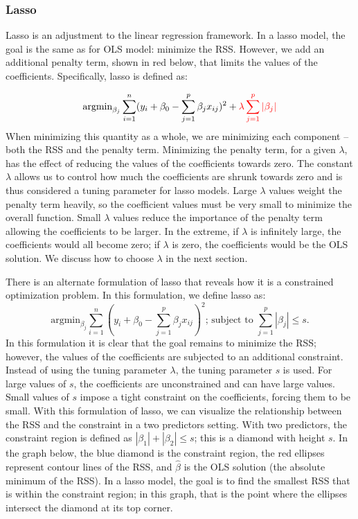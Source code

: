 \documentclass[
]{article}
\begin{document}
\hypertarget{lasso}{%
\subsubsection{Lasso}\label{lasso}}

Lasso is an adjustment to the linear regression framework. In a lasso
model, the goal is the same as for OLS model: minimize the RSS. However,
we add an additional penalty term, shown in red below, that limits the
values of the coefficients. Specifically, lasso is defined as:

\[\text{argmin}_{\beta_j}\sum_{i=1}^n ( y_i +\beta_0 - \sum_{j=1}^p \beta_jx_{ij} )^2 + \color{red}{\lambda \sum_{j=1}^p |\beta_j|}\]
When minimizing this quantity as a whole, we are minimizing each
component -- both the RSS and the penalty term. Minimizing the penalty
term, for a given \(\lambda\), has the effect of reducing the values of
the coefficients towards zero. The constant \(\lambda\) allows us to
control how much the coefficients are shrunk towards zero and is thus
considered a tuning parameter for lasso models. Large \(\lambda\) values
weight the penalty term heavily, so the coefficient values must be very
small to minimize the overall function. Small \(\lambda\) values reduce
the importance of the penalty term allowing the coefficients to be
larger. In the extreme, if \(\lambda\) is infinitely large, the
coefficients would all become zero; if \(\lambda\) is zero, the
coefficients would be the OLS solution. We discuss how to choose
\(\lambda\) in the next section.

There is an alternate formulation of lasso that reveals how it is a
constrained optimization problem. In this formulation, we define lasso
as: \[
\text{argmin}_{\beta_j}\sum_{i=1}^n ( y_i +\beta_0 - \sum_{j=1}^p \beta_jx_{ij} )^2  \text{; subject to }  \sum_{j=1}^p |\beta_j| \le s.
\] In this formulation it is clear that the goal remains to minimize the
RSS; however, the values of the coefficients are subjected to an
additional constraint. Instead of using the tuning parameter
\(\lambda\), the tuning parameter \(s\) is used. For large values of
\(s\), the coefficients are unconstrained and can have large values.
Small values of \(s\) impose a tight constraint on the coefficients,
forcing them to be small. With this formulation of lasso, we can
visualize the relationship between the RSS and the constraint in a two
predictors setting. With two predictors, the constraint region is
defined as \(|\beta_1| + |\beta_2| \le s\); this is a diamond with
height \(s\). In the graph below, the blue diamond is the constraint
region, the red ellipses represent contour lines of the RSS, and
\(\hat{\beta}\) is the OLS solution (the absolute minimum of the RSS).
In a lasso model, the goal is to find the smallest RSS that is within
the constraint region; in this graph, that is the point where the
ellipses intersect the diamond at its top corner.
\end{document}
